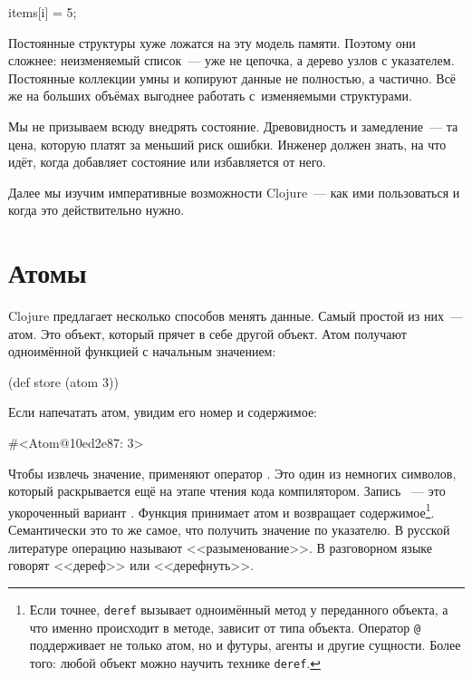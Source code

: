 \begin{python}
items[i] = 5;
\end{python}

Постоянные структуры хуже ложатся на эту модель памяти. Поэтому они сложнее:
неизменяемый список~--- уже не цепочка, а дерево узлов с указателем. Постоянные
коллекции умны и копируют данные не полностью, а частично. Всё же на больших
объёмах выгоднее работать с~изменяемыми структурами.

Мы не призываем всюду внедрять состояние. Древовидность и замедление~--- та
цена, которую платят за меньший риск ошибки. Инженер должен знать, на что идёт,
когда добавляет состояние или избавляется от него.

Далее мы изучим императивные возможности Clojure~--- как ими пользоваться и
когда это действительно нужно.

\section{Атомы}


Clojure предлагает несколько способов менять данные. Самый простой из них~---
атом. Это объект, который прячет в себе другой объект. Атом получают одноимённой
функцией с начальным значением:

\begin{clojure}
(def store (atom 3))
\end{clojure}

Если напечатать атом, увидим его номер и содержимое:

\begin{clojure}
#<Atom@10ed2e87: 3>
\end{clojure}

Чтобы извлечь значение, применяют оператор . Это один из немногих
символов, который раскрывается ещё на этапе чтения кода компилятором. Запись
~--- это укороченный вариант . Функция
 принимает атом и возвращает содержимое\footnote{Если точнее,
  \texttt{deref} вызывает одноимённый метод у переданного объекта, а что именно
  происходит в методе, зависит от типа объекта. Оператор \texttt{@} поддерживает
  не только атом, но и футуры, агенты и другие сущности. Более того: любой
  объект можно научить технике \texttt{deref}.}. Семантически это то же самое,
что получить значение по указателю. В русской литературе операцию называют
<<разыменование>>. В разговорном языке говорят <<дереф>> или <<дерефнуть>>.

